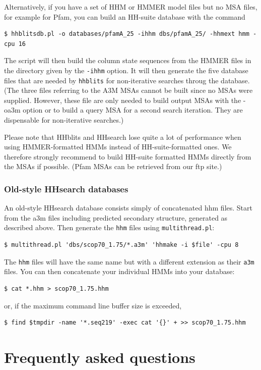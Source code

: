 \documentclass[11pt,a4paper]{article}
\begin{document}
Alternatively, if you have a set of HHM or HMMER model files but no MSA files, for example for Pfam, you can build an HH-suite database with the command
\begin{verbatim}
$ hhblitsdb.pl -o databases/pfamA_25 -ihhm dbs/pfamA_25/ -hhmext hmm -cpu 16
\end{verbatim}
The script will then build the column state sequences from the HMMER files in the directory given by the \verb`-ihhm` option. It will then generate the five database files that are needed by \verb`hhblits` for non-iterative searches throug the database. (The three files referring to the A3M MSAs cannot be built since no MSAs were supplied. However, these file are only needed to build output MSAs with the -oa3m option or to build a query MSA for a second search iteration. They are dispensable for non-iterative searches.)

Please note that HHblits and HHsearch lose quite a lot of performance when using HMMER-formatted HMMs instead of HH-suite-formatted ones. We therefore strongly recommend to build HH-suite formatted HMMs directly from the MSAs if possible. (Pfam MSAs can be retrieved from our ftp site.)


\subsubsection*{Old-style HHsearch databases}

An old-style HHsearch database consists simply of concatenated hhm files. Start from the a3m files including predicted secondary structure, generated as described above. Then generate the \verb`hhm` files using \verb`multithread.pl`:
\begin{verbatim}
$ multithread.pl 'dbs/scop70_1.75/*.a3m' 'hhmake -i $file' -cpu 8 
\end{verbatim}
The \verb`hhm` files will have the same name but with a different extension as their \verb`a3m` files. You 
can then concatenate your individual HMMs into your database:
\begin{verbatim}
$ cat *.hhm > scop70_1.75.hhm
\end{verbatim}
or, if the maximum command line buffer size is exceeded, 
\begin{verbatim}
$ find $tmpdir -name '*.seq219' -exec cat '{}' + >> scop70_1.75.hhm
\end{verbatim}



\section{Frequently asked questions}
\end{document}
